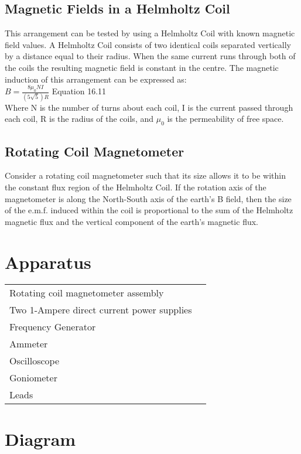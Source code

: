 \documentclass{article}
\begin{document}
\subsection{Magnetic Fields in a Helmholtz Coil}
This arrangement can be tested by using a Helmholtz Coil with known magnetic field values. A Helmholtz Coil consists of two identical coils separated vertically by a distance equal to their radius. When the same current runs through both of the coils the resulting magnetic field is constant in the centre. The magnetic induction of this arrangement can be expressed as:\\

$B=\frac{8\mu_0 NI}{(5\sqrt{5})R}$ Equation 16.11\\

Where N is the number of turns about each coil, I is the current passed through each coil, R is the radius of the coils, and $\mu_0$ is the permeability of free space.\\

\subsection{Rotating Coil Magnetometer}
Consider a rotating coil magnetometer such that its size allows it to be within the constant flux region of the Helmholtz Coil. If the rotation axis of the magnetometer is along the North-South axis of the earth's B field, then the size of the e.m.f. induced within the coil is proportional to the sum of the Helmholtz magnetic flux and the vertical component of the earth's magnetic flux.
\section{Apparatus}
\begin{tabular}{ll}
Rotating coil magnetometer assembly\\
Two 1-Ampere direct current power supplies\\
Frequency Generator\\
Ammeter\\
Oscilloscope\\
Goniometer\\
Leads\\

\end{tabular}

\section{Diagram}
\end{document}
